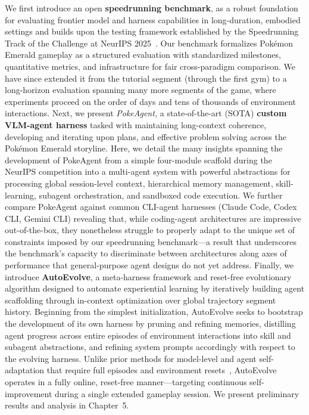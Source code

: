 We first introduce an open \textbf{speedrunning benchmark}, as a robust foundation for evaluating frontier model and harness capabilities in long-duration, embodied settings and builds upon the testing framework established by the Speedrunning Track of the \pokeagent{} Challenge at NeurIPS 2025~\citep{karten2025pokeagent}. Our benchmark formalizes Pok\'{e}mon Emerald gameplay as a structured evaluation with standardized milestones, quantitative metrics, and infrastructure for fair cross-paradigm comparison. We have since extended it from the tutorial segment (through the first gym) to a long-horizon evaluation spanning many more segments of the game, where experiments proceed on the order of days and tens of thousands of environment interactions. Next, we present \textit{PokeAgent,} a state-of-the-art (SOTA) \textbf{custom VLM-agent harness} tasked with maintaining long-context coherence, developing and iterating upon plans, and effective problem solving across the Pok\'{e}mon Emerald storyline. Here, we detail the many insights spanning the development of PokeAgent from a simple four-module scaffold during the NeurIPS competition into a multi-agent system with powerful abstractions for processing global session-level context, hierarchical memory management, skill-learning, subagent orchestration, and sandboxed code execution. We further compare PokeAgent against common CLI-agent harnesses (Claude Code, Codex CLI, Gemini CLI) revealing that, while coding-agent architectures are impressive out-of-the-box, they
nonetheless struggle to properly adapt to the unique set of constraints imposed by our speedrunning benchmark---a result that underscores the benchmark's capacity to discriminate between architectures along axes of performance that general-purpose agent designs do not yet address. Finally, we introduce \textbf{AutoEvolve}, a meta-harness framework and reset-free evolutionary algorithm designed to automate experiential learning by iteratively building agent scaffolding through in-context optimization over global trajectory segment history. Beginning from the simplest initialization, AutoEvolve seeks to bootstrap the development of its own harness by pruning and refining memories, distilling agent progress across entire episodes of environment interactions into skill and subagent abstractions, and refining system prompts accordingly with respect to the evolving harness. Unlike prior methods for model-level and agent self-adaptation that require full episodes and environment resets~\citep{agrawal2025gepa}, AutoEvolve operates in a fully online, reset-free manner---targeting continuous self-improvement during a single extended gameplay session. We present preliminary results and analysis in Chapter~5.

